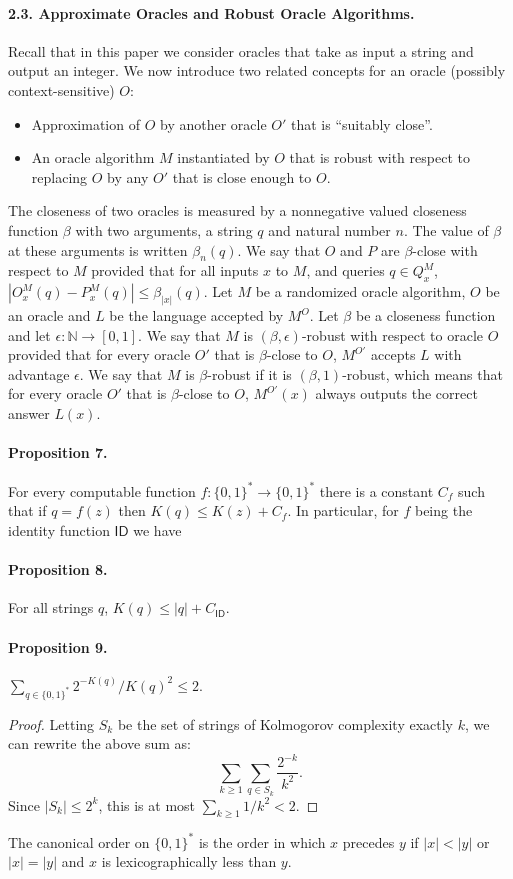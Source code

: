 \paragraph{2.3. Approximate Oracles and Robust Oracle Algorithms.}
Recall that in this paper we consider oracles that take as input a string and output an integer. We now introduce two related concepts for an oracle (possibly context-sensitive) $O$:
\begin{itemize}
\item Approximation of $O$ by another oracle $O'$ that is ``suitably close''.
\item An oracle algorithm $M$ instantiated by $O$ that is robust with respect to replacing $O$ by any $O'$ that is close enough to $O$.
\end{itemize}
The closeness of two oracles is measured by a nonnegative valued closeness function $\beta$ with two arguments, a string $q$ and natural number $n$. The value of $\beta$ at these arguments is written $\beta_n(q)$. We say that $O$ and $P$ are $\beta$-close with respect to $M$ provided that for all inputs $x$ to $M$, and queries $q\in Q_x^M$, $|O_x^M(q)-P_x^M(q)|\leq\beta_{|x|}(q)$.
Let $M$ be a randomized oracle algorithm, $O$ be an oracle and $L$ be the language accepted by $M^O$. Let $\beta$ be a closeness function and let $\epsilon:\mathbb N\to[0,1]$. We say that $M$ is $(\beta,\epsilon)$-robust with respect to oracle $O$ provided that for every oracle $O'$ that is $\beta$-close to $O$, $M^{O'}$ accepts $L$ with advantage $\epsilon$. We say that $M$ is $\beta$-robust if it is $(\beta,1)$-robust, which means that for every oracle $O'$ that is $\beta$-close to $O$, $M^{O'}(x)$ always outputs the correct answer $L(x)$.
\paragraph{Proposition 7.}
For every computable function $f:\{0,1\}^*\to\{0,1\}^*$ there is a constant $C_f$ such that if $q=f(z)$ then $K(q)\leq K(z)+C_f$.
In particular, for $f$ being the identity function $\mathsf{ID}$ we have
\paragraph{Proposition 8.}
For all strings $q$, $K(q)\leq|q|+C_{\mathsf{ID}}$.
\paragraph{Proposition 9.}
$\sum_{q\in\{0,1\}^*}2^{-K(q)}/K(q)^2\leq2$.
\begin{proof}
Letting $S_k$ be the set of strings of Kolmogorov complexity exactly $k$, we can rewrite the above sum as:
\[\sum_{k\geq1}\sum_{q\in S_k}\frac{2^{-k}}{k^2}.\]
Since $|S_k|\leq2^k$, this is at most $\sum_{k\geq1}1/k^2<2$.
\end{proof}
The canonical order on $\{0,1\}^*$ is the order in which $x$ precedes $y$ if $|x|<|y|$ or $|x|=|y|$ and $x$ is lexicographically less than $y$.
